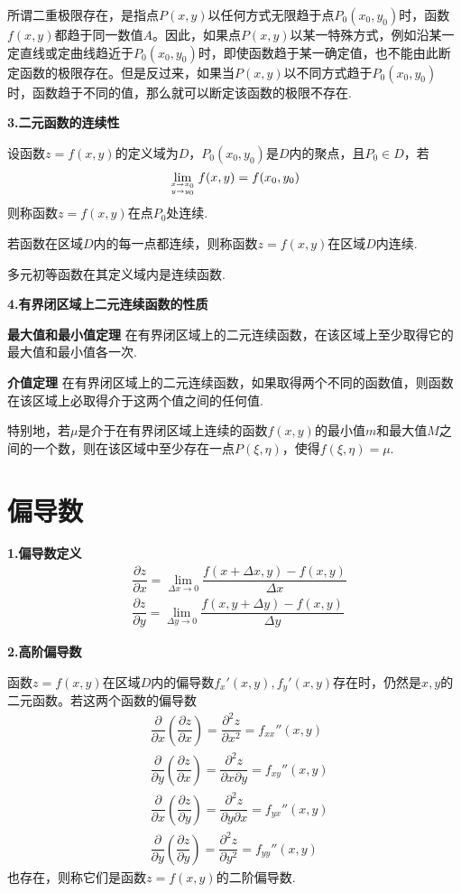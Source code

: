 所谓二重极限存在，是指点$P(x,y)$以任何方式无限趋于点$P_0(x_0,y_0)$时，函数$f(x,y)$都趋于同一数值$A$。因此，如果点$P(x,y)$以某一特殊方式，例如沿某一定直线或定曲线趋近于$P_0(x_0,y_0)$时，即使函数趋于某一确定值，也不能由此断定函数的极限存在。但是反过来，如果当$P(x,y)$以不同方式趋于$P_0(x_0,y_0)$时，函数趋于不同的值，那么就可以断定该函数的极限不存在.

\textbf{3.二元函数的连续性}

设函数$z=f(x,y)$的定义域为$D$，$P_0(x_0,y_0)$是$D$内的聚点，且$P_0\in D$，若
\begin{equation*}
    \lim_{x\rightarrow x_0 \atop y\rightarrow y_0}f(x,y)=f(x_0,y_0)
\end{equation*}
则称函数$z=f(x,y)$在点$P_0$处连续.

若函数在区域$D$内的每一点都连续，则称函数$z=f(x,y)$在区域$D$内连续.

多元初等函数在其定义域内是连续函数.

\textbf{4.有界闭区域上二元连续函数的性质}

\textbf{最大值和最小值定理} \quad 在有界闭区域上的二元连续函数，在该区域上至少取得它的最大值和最小值各一次.

\textbf{介值定理} \quad 在有界闭区域上的二元连续函数，如果取得两个不同的函数值，则函数在该区域上必取得介于这两个值之间的任何值.

特别地，若$\mu$是介于在有界闭区域上连续的函数$f(x,y)$的最小值$m$和最大值$M$之间的一个数，则在该区域中至少存在一点$P(\xi, \eta)$，使得$f(\xi, \eta)=\mu$.

\section{偏导数}
\textbf{1.偏导数定义}
\begin{align*}
    & \dfrac{\partial z}{\partial x}=\lim_{\Delta x\rightarrow 0}\dfrac{f(x+\Delta x,y)-f(x,y)}{\Delta x} \\
    & \dfrac{\partial z}{\partial y}=\lim_{\Delta y\rightarrow 0}\dfrac{f(x,y+\Delta y)-f(x,y)}{\Delta y}
\end{align*}

\textbf{2.高阶偏导数}

函数$z=f(x,y)$在区域$D$内的偏导数$f_x'(x,y),f_y'(x,y)$存在时，仍然是$x,y$的二元函数。若这两个函数的偏导数
\begin{align*}
    & \dfrac{\partial}{\partial x}\left(\dfrac{\partial z}{\partial x}\right)=\dfrac{\partial^2 z}{\partial x^2}=f_{xx}''(x,y) \\
    & \dfrac{\partial}{\partial y}\left(\dfrac{\partial z}{\partial x}\right)=\dfrac{\partial^2 z}{\partial x\partial y}=f_{xy}''(x,y) \\
    & \dfrac{\partial}{\partial x}\left(\dfrac{\partial z}{\partial y}\right)=\dfrac{\partial^2 z}{\partial y\partial x}=f_{yx}''(x,y) \\
    & \dfrac{\partial}{\partial y}\left(\dfrac{\partial z}{\partial y}\right)=\dfrac{\partial^2 z}{\partial y^2}=f_{yy}''(x,y)
\end{align*}
也存在，则称它们是函数$z=f(x,y)$的二阶偏导数.

